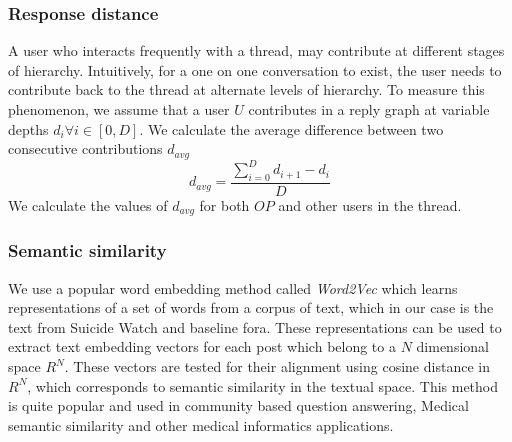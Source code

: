 \subsubsection{Response distance}
A user who interacts frequently with a thread, may contribute at different stages of hierarchy. Intuitively, for a one on one conversation to exist, the user needs to contribute back to the thread at alternate levels of hierarchy. To measure this phenomenon, we assume that a user $U$ contributes in a reply graph at variable depths $d_i \forall i \in [0,D]$. 
We calculate the average difference between two consecutive contributions $d_{avg}$
$$ d_{avg} = \frac{\sum_{i=0}^{D} d_{i+1} - d_i }{D}$$
We calculate the values of $d_{avg}$ for both $OP$ and other users in the thread.


\subsubsection{Semantic similarity}
\label{Sec:Semantic}
We use a popular word embedding method called \textit{Word2Vec} \cite{mikolov2013distributed} which learns representations of a set of words from a corpus of text, which in our case is the text from Suicide Watch and baseline fora. These representations can be used to extract text embedding vectors for each post which belong to a $N$ dimensional space $R^N$. These vectors are tested for their alignment using cosine distance in $R^N$, which corresponds to semantic similarity in the textual space. This method is quite popular and used in community based question answering\cite{mihaylov2016semanticz}, Medical semantic similarity \cite{de2014medical} and other medical informatics applications\cite{zhu2017semantic}.



